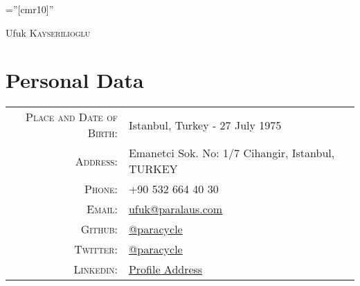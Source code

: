 \documentclass[a4paper,10pt]{article}
\begin{document}
\pagestyle{empty} %

\font\fb=''[cmr10]'' %

\par{\centering
		{\Huge Ufuk \textsc{Kayserilioglu}
	}\bigskip\par}

\section{Personal Data}

\begin{tabular}{rl}
    \textsc{Place and Date of Birth:} & Istanbul, Turkey  - 27 July 1975 \\
    \textsc{Address:}                 & Emanetci Sok. No: 1/7 Cihangir, Istanbul, TURKEY \\
    \textsc{Phone:}                   & +90 532 664 40 30 \\
    \textsc{Email:}                   & \href{mailto:ufuk@paralaus.com}{ufuk@paralaus.com} \\
    \textsc{Github:}                  & \href{https://github.com/paracycle}{@paracycle} \\
    \textsc{Twitter:}                 & \href{https://twitter.com/paracycle}{@paracycle} \\
    \textsc{Linkedin:}                & \href{https://www.linkedin.com/in/ufukkayserilioglu}{Profile Address} \\
\end{tabular}

\end{document}
